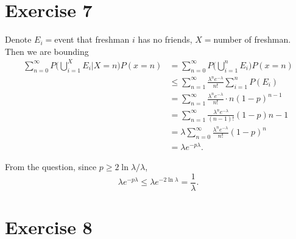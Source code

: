 \documentclass{article}
\begin{document}
\section*{Exercise 7}
Denote $E_i = $event that freshman $i$ has no friends, $X = $number of freshman. Then we are bounding
\begin{align*}
	\sum_{n = 0}^{\infty} P \biggl( \bigcup_{i = 1}^X E_i \bigg| X = n \biggr) P(x = n)
	&= \sum_{n = 0}^{\infty} P \biggl( \bigcup_{i = 1}^n E_i \biggr) P(x = n) \\
	&\leq \sum_{n = 1}^{\infty} \frac{\lambda^n e^{-\lambda}}{n!} \sum_{i = 1}^{n} P(E_i) \\
	&= \sum_{n = 1}^{\infty} \frac{\lambda^n e^{-\lambda}}{n!} \cdot n(1 - p)^{n - 1} \\
	&= \sum_{n = 1}^{\infty} \frac{\lambda^n e^{-\lambda}}{(n - 1)!} (1 - p){n - 1} \\
	&= \lambda \sum_{n = 0}^{\infty} \frac{\lambda^n e^{-\lambda}}{n!}(1 - p)^n \\
	&= \lambda e^{-p \lambda}.
\end{align*}

From the question, since $p \geq 2 \ln{\lambda} / \lambda$, 
\[ \lambda e^{-p \lambda} \leq \lambda e^{-2 \ln{\lambda}} = \frac{1}{\lambda}. \]


\newpage
\section*{Exercise 8}
\end{document}
